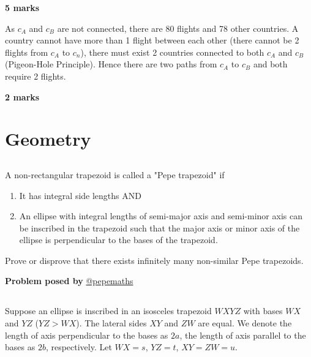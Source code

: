 \documentclass[12pt]{article}
\begin{document}
\begin{flushright}
\textbf{5 marks}
\end{flushright}
As $c_A$ and $c_B$ are not connected, there are 80 flights and 78 other countries. A country cannot have more than 1 flight between each other (there cannot be 2 flights from $c_A$ to $c_n$), there must exist 2 countries connected to both $c_A$ and $c_B$ (Pigeon-Hole Principle). Hence there are two paths from $c_A$ to $c_B$ and both require 2 flights.
\begin{flushright}
\textbf{2 marks}
\end{flushright}




\newpage
\section*{Geometry}




\subsection*{}
A non-rectangular trapezoid is called a "Pepe trapezoid" if
\begin{enumerate}
\item It has integral side lengths AND
\item An ellipse with integral lengths of semi-major axis and semi-minor axis can be inscribed in the trapezoid such that the major axis or minor axis of the ellipse is perpendicular to the bases of the trapezoid.
\end{enumerate}
Prove or disprove that there exists infinitely many non-similar Pepe trapezoids.

\begin{flushright}
\textbf{Problem posed by}
\textcolor{RoyalBlue2}{\href{https://www.instagram.com/pepemaths/}{@pepemaths}}
\end{flushright}




\subsection*{}
Suppose an ellipse is inscribed in an isosceles trapezoid $WXYZ$ with bases $WX$ and $YZ$ ($YZ>WX$). The lateral sides $XY$ and $ZW$ are equal. We denote the length of axis perpendicular to the bases as $2a$, the length of axis parallel to the bases as $2b$, respectively. Let $WX=s$, $YZ=t$, $XY=ZW=u$.
\end{document}
